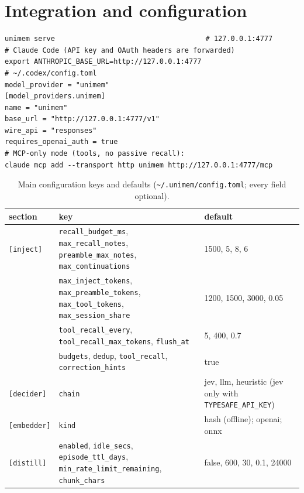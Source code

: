 \documentclass[10pt,twocolumn]{article}
\newcommand{\code}[1]{\texttt{\small #1}}
\begin{document}
\section{Integration and configuration}
\label{app:config}
\begin{small}
\begin{verbatim}
unimem serve                                    # 127.0.0.1:4777
# Claude Code (API key and OAuth headers are forwarded)
export ANTHROPIC_BASE_URL=http://127.0.0.1:4777
# ~/.codex/config.toml
model_provider = "unimem"
[model_providers.unimem]
name = "unimem"
base_url = "http://127.0.0.1:4777/v1"
wire_api = "responses"
requires_openai_auth = true
# MCP-only mode (tools, no passive recall):
claude mcp add --transport http unimem http://127.0.0.1:4777/mcp
\end{verbatim}
\end{small}

\begin{table}[H]
\centering\small
\caption{Main configuration keys and defaults (\code{\textasciitilde/.unimem/config.toml}; every field optional).}
\label{tab:config}
\begin{tabularx}{\textwidth}{@{}l>{\raggedright\arraybackslash}Xl@{}}
\toprule
section & key & default \\
\midrule
\code{[inject]} & \code{recall\_budget\_ms}, \code{max\_recall\_notes}, \code{preamble\_max\_notes}, \code{max\_continuations} & 1500, 5, 8, 6 \\
& \code{max\_inject\_tokens}, \code{max\_preamble\_tokens}, \code{max\_tool\_tokens}, \code{max\_session\_share} & 1200, 1500, 3000, 0.05 \\
& \code{tool\_recall\_every}, \code{tool\_recall\_max\_tokens}, \code{flush\_at} & 5, 400, 0.7 \\
& \code{budgets}, \code{dedup}, \code{tool\_recall}, \code{correction\_hints} & true \\
\code{[decider]} & \code{chain} & jev, llm, heuristic (jev only with \code{TYPESAFE\_API\_KEY}) \\
\code{[embedder]} & \code{kind} & hash (offline); openai; onnx \\
\code{[distill]} & \code{enabled}, \code{idle\_secs}, \code{episode\_ttl\_days}, \code{min\_rate\_limit\_remaining}, \code{chunk\_chars} & false, 600, 30, 0.1, 24000 \\
\bottomrule
\end{tabularx}
\end{table}
\end{document}
